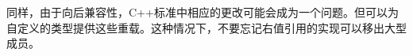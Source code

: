 同样，由于向后兼容性，C++标准中相应的更改可能会成为一个问题。但可以为自定义的类型提供这些重载。这种情况下，不要忘记右值引用的实现可以移出大型成员。






















































